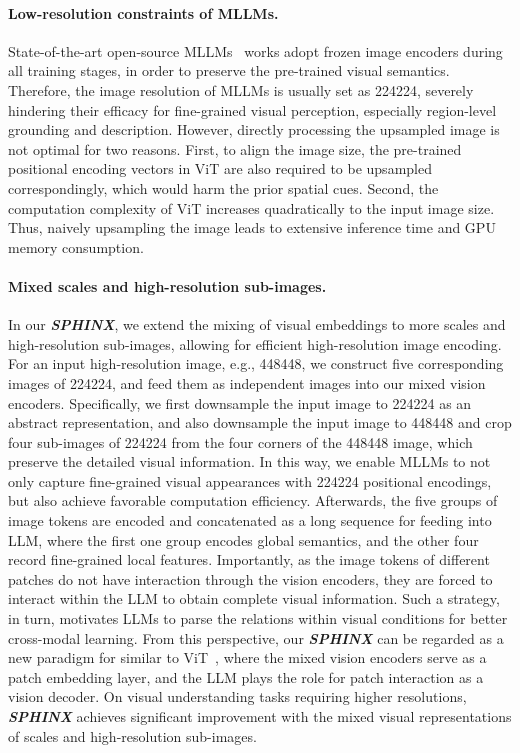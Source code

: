 \documentclass{article} \usepackage{iclr2024_conference,times}
\begin{document}
\paragraph{Low-resolution constraints of MLLMs.}
State-of-the-art open-source MLLMs~\citep{li2023blip,llava,gao2023llama,chen2023shikra,peng2023kosmos,chen2023minigpt} works adopt frozen image encoders during all training stages, in order to preserve the pre-trained visual semantics. Therefore, the image resolution of MLLMs is usually set as 224224, severely hindering their efficacy for fine-grained visual perception, especially region-level grounding and description. However, directly processing the upsampled image is not optimal for two reasons. First, to align the image size, the pre-trained positional encoding vectors in ViT are also required to be upsampled correspondingly, which would harm the prior spatial cues. Second, the computation complexity of ViT increases quadratically to the input image size. Thus, naively upsampling the image leads to extensive inference time and GPU memory consumption.

\paragraph{Mixed scales and high-resolution sub-images.}
In our \textcolor{Goldenrod3}{\textbf{\textit{SPHINX}}}, we extend the mixing of visual embeddings to more scales and high-resolution sub-images, allowing for efficient high-resolution image encoding. For an input high-resolution image, e.g., 448448, we construct five corresponding images of 224224, and feed them as independent images into our mixed vision encoders. Specifically, we first downsample the input image to 224224 as an abstract representation, and also downsample the input image to 448448 and crop four sub-images of 224224 from the four corners of the 448448 image, which preserve the detailed visual information. In this way, we enable MLLMs to not only capture fine-grained visual appearances with 224224 positional encodings, but also achieve favorable computation efficiency. Afterwards, the five groups of image tokens are encoded and concatenated as a long sequence for feeding into LLM, where the first one group encodes global semantics, and the other four record fine-grained local features. 
Importantly, as the image tokens of different patches do not have interaction through the vision encoders, they are forced
to interact within the LLM to obtain complete visual information.
Such a strategy, in turn, motivates LLMs to parse
the relations within visual conditions for better cross-modal learning.
From this perspective, our \textcolor{Goldenrod3}{\textbf{\textit{SPHINX}}} can be regarded as a new paradigm for similar to ViT~\citep{dosovitskiy2020image}, where the mixed vision encoders serve as a patch embedding layer, and the LLM plays the role for patch interaction as a vision decoder.
On visual understanding tasks requiring higher resolutions, \textcolor{Goldenrod3}{\textbf{\textit{SPHINX}}} achieves significant improvement with the mixed visual representations of scales and high-resolution sub-images.
\end{document}
